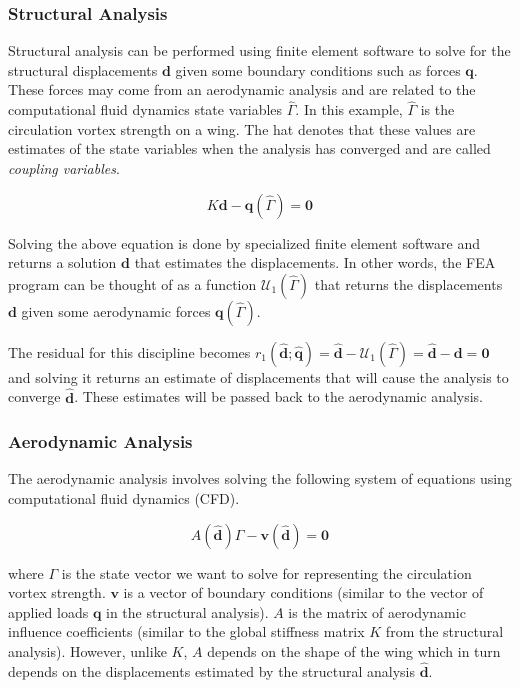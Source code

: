 \documentclass[11pt]{article}
\begin{document}
\hypertarget{structural-analysis}{%
\subsubsection{Structural Analysis}\label{structural-analysis}}

Structural analysis can be performed using finite element software to
solve for the structural displacements \(\mathbf{d}\) given some
boundary conditions such as forces \(\mathbf{q}\). These forces may come
from an aerodynamic analysis and are related to the computational fluid
dynamics state variables \(\hat{\Gamma}\). In this example,
\(\hat{\Gamma}\) is the circulation vortex strength on a wing. The hat
denotes that these values are estimates of the state variables when the
analysis has converged and are called \emph{coupling variables}.

\begin{equation}
K\mathbf{d} - \mathbf{q}(\hat{\Gamma}) = \mathbf{0}
\tag{1}
\end{equation}

Solving the above equation is done by specialized finite element
software and returns a solution \({\mathbf{d}}\) that estimates the
displacements. In other words, the FEA program can be thought of as a
function \(\mathcal{U}_1(\hat{\Gamma})\) that returns the displacements
\({\mathbf{d}}\) given some aerodynamic forces
\(\mathbf{q}(\hat{\Gamma})\).

The residual for this discipline becomes
\(r_1(\hat{\mathbf{d}};\hat{\mathbf{q}}) = \hat{\mathbf{d}} - \mathcal{U}_1(\hat{\Gamma}) = \hat{\mathbf{d}} - {\mathbf{d}} = \mathbf{0}\)
and solving it returns an estimate of displacements that will cause the
analysis to converge \(\hat{\mathbf{d}}\). These estimates will be
passed back to the aerodynamic analysis.

\hypertarget{aerodynamic-analysis}{%
\subsubsection{Aerodynamic Analysis}\label{aerodynamic-analysis}}

The aerodynamic analysis involves solving the following system of
equations using computational fluid dynamics (CFD).

\begin{equation}
A(\hat{\mathbf{d}})\Gamma - \mathbf{v}(\hat{\mathbf{d}}) = \mathbf{0}
\tag{2}
\end{equation}

where \(\Gamma\) is the state vector we want to solve for representing
the circulation vortex strength. \(\mathbf{v}\) is a vector of boundary
conditions (similar to the vector of applied loads \(\mathbf{q}\) in the
structural analysis). \(A\) is the matrix of aerodynamic influence
coefficients (similar to the global stiffness matrix \(K\) from the
structural analysis). However, unlike \(K\), \(A\) depends on the shape
of the wing which in turn depends on the displacements estimated by the
structural analysis \(\hat{\mathbf{d}}\).
\end{document}
